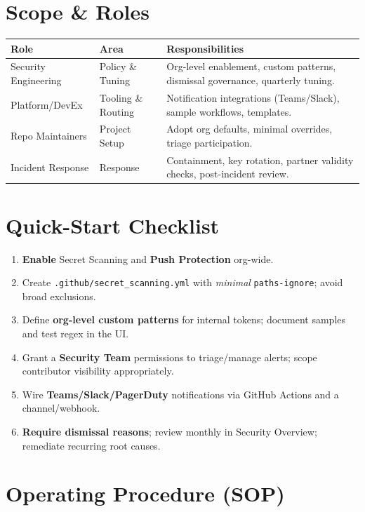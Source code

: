 \documentclass[11pt,a4paper,oneside,notitlepage]{article}
\begin{document}
\section{Scope \& Roles}
\begin{table}[h]
\centering
\begin{tabular}{@{}llp{8cm}@{}}
\toprule
\textbf{Role} & \textbf{Area} & \textbf{Responsibilities} \\
\midrule
Security Engineering & Policy \& Tuning & Org-level enablement, custom patterns, dismissal governance, quarterly tuning. \\
Platform/DevEx & Tooling \& Routing & Notification integrations (Teams/Slack), sample workflows, templates. \\
Repo Maintainers & Project Setup & Adopt org defaults, minimal overrides, triage participation. \\
Incident Response & Response & Containment, key rotation, partner validity checks, post-incident review. \\
\bottomrule
\end{tabular}
\end{table}

\section{Quick-Start Checklist}
\begin{enumerate}
  \item \textbf{Enable} Secret Scanning and \textbf{Push Protection} org-wide.
  \item Create \texttt{.github/secret\_scanning.yml} with \emph{minimal} \texttt{paths-ignore}; avoid broad exclusions.
  \item Define \textbf{org-level custom patterns} for internal tokens; document samples and test regex in the UI.
  \item Grant a \textbf{Security Team} permissions to triage/manage alerts; scope contributor visibility appropriately.
  \item Wire \textbf{Teams/Slack/PagerDuty} notifications via GitHub Actions and a channel/webhook.
  \item \textbf{Require dismissal reasons}; review monthly in Security Overview; remediate recurring root causes.
\end{enumerate}

\section{Operating Procedure (SOP)}
\end{document}
